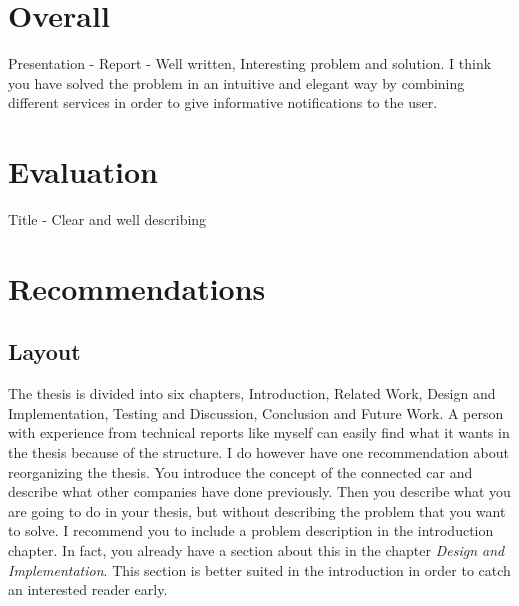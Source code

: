 \documentclass[
10pt, %
a4paper, %
oneside, %
headinclude,footinclude, %
BCOR5mm, %
]{scrartcl}
\title{\normalfont\spacedallcaps{Destination Prediction with Decision Tree}}
\author{\spacedlowsmallcaps{An opposition by Martin Agfjord*}}
\date{} %
\begin{document}
\renewcommand{\sectionmark}[1]{\markright{\spacedlowsmallcaps{#1}}}
\lehead{\mbox{\llap{\small\thepage\kern1em\color{halfgray} \vline}\color{halfgray}\hspace{0.5em}\rightmark\hfil}} %

\pagestyle{scrheadings} %

\maketitle %

{\let\thefootnote\relax{}

\section*{Overall}
Presentation -
\newline
Report - Well written, Interesting problem and solution.
I think you have solved the problem in an intuitive and elegant way by combining different services in order to give informative notifications to the user.
\section*{Evaluation}
Title - Clear and well describing

\section*{Recommendations}
\subsection*{Layout}

The thesis is divided into six chapters, Introduction, Related Work, Design and Implementation, Testing and Discussion, Conclusion and Future Work. A person with experience from technical reports like myself can easily find what it wants in the thesis because of the structure.
\newline
\newline
I do however have one recommendation about reorganizing the thesis. You introduce the concept of the connected car and describe what other companies have done previously. Then you describe what you are going to do in your thesis, but without describing the problem that you want to solve. I recommend you to include a problem description in the introduction chapter.
\newline
\newline
In fact, you already have a section about this in the chapter \emph{Design and Implementation}. This section is better suited in the introduction in order to catch an interested reader early.

}
\end{document}
